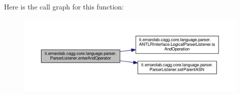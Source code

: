 Here is the call graph for this function\-:\nopagebreak
\begin{figure}[H]
\begin{center}
\leavevmode
\includegraphics[width=350pt]{classit_1_1emarolab_1_1cagg_1_1core_1_1language_1_1parser_1_1ParserListener_a27394515e7347376dc937974202abbc9_cgraph}
\end{center}
\end{figure}


